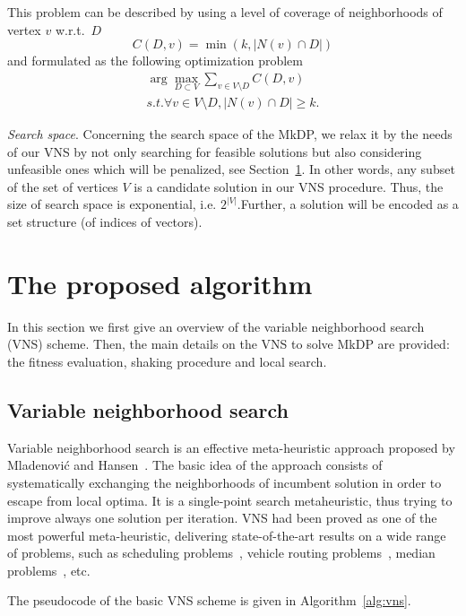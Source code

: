 \documentclass[sigconf]{acmart}
\begin{document}
    
    This problem can be described by using a level of coverage of neighborhoods of vertex $v$ w.r.t.\ $D$
    \begin{equation}
    	C(D, v) = \min(k, |N(v) \cap D|)
    \end{equation}
and  formulated as the following optimization problem 
\begin{align}
    \arg \max_{D \subset V } \sum_{v \in V\setminus D} C(D,v) \\
    s.t. \forall v \in V \setminus D, |N(v) \cap D| \geq k.
\end{align}
    
\emph{Search space}.    Concerning the search space of the MkDP, we relax it by the needs of our VNS by not only searching for feasible solutions but also considering unfeasible ones which will be penalized, see Section~\ref{sec:vns}.  In other words, any subset of the set of vertices $V$ is a candidate solution in our VNS procedure. Thus, the size of search space is exponential, i.e. $2^{|V|}$.Further, a solution will be encoded as a set structure (of indices of vectors). 
   
   
\section{The proposed algorithm}\label{sec:vns}

In this section we first give an overview of the variable neighborhood search (VNS) scheme. Then, the main details on the VNS to solve MkDP are provided: the fitness evaluation, shaking procedure and local search.
 
  \subsection{Variable neighborhood search}
 Variable neighborhood search is an effective meta-heuristic approach proposed by Mladenović and Hansen~\cite{mladenovic1997variable}. The basic idea of the approach consists of systematically exchanging the neighborhoods of incumbent solution in order to escape from local optima. It is a single-point search metaheuristic, thus trying to improve always one solution per iteration. VNS had been proved as one of the most powerful meta-heuristic, delivering state-of-the-art results on a wide range of problems, such as scheduling problems~\cite{fleszar2004solving}, vehicle routing problems~\cite{rezgui2019application}, median problems~\cite{herran2019variable}, etc.  
  
  The pseudocode of the basic VNS scheme is given in Algorithm~\ref{alg:vns}.
  
\end{document}

